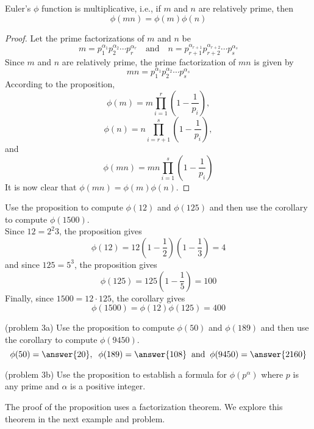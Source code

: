 \documentclass[handout]{ximera}
\begin{document}
\begin{corollary}
Euler's $\phi$ function is multiplicative, i.e., if $m$ and $n$ are relatively prime, then
\[
\phi(mn) = \phi(m)\phi(n)
\]
\end{corollary}
\begin{proof}
Let the prime factorizations of $m$ and $n$ be
\[
m = p_1^{\alpha_1} p_2^{\alpha_2}\cdots p_r^{\alpha_r} \quad \text{and} \quad n = p_{r+1}^{\alpha_{r+1}} p_{r+2}^{\alpha_{r+2}}\cdots p_s^{\alpha_s}
\]
Since $m$ and $n$ are relatively prime, the prime factorization of $mn$ is given by
\[
mn = p_1^{\alpha_1} p_2^{\alpha_2}\cdots p_s^{\alpha_s}
\]
According to the proposition,
\[
\phi(m) = m \prod_{i = 1}^r \left(1 - \frac{1}{p_i}\right),
\]
\[
\phi(n) = n \prod_{i = r+1}^s \left(1 - \frac{1}{p_i}\right),
\]
and
\[
\phi(mn) = mn \prod_{i = 1}^s \left(1 - \frac{1}{p_i}\right)
\]
It is now clear that $\phi(mn) = \phi(m) \phi(n)$.
\end{proof}

\begin{example}[example 3]
Use the proposition to compute $\phi(12)$ and $\phi(125)$ and then use the corollary to compute $\phi(1500)$.\\
Since $12 = 2^2 3$, the proposition gives
\[
\phi(12) = 12\left(1-\frac12\right)\left(1-\frac13\right) = 4
\]
and since $125 = 5^3$, the proposition gives
\[
\phi(125) = 125\left(1-\frac15\right) = 100
\]
Finally, since $1500 = 12 \cdot 125$, the corollary gives
\[
\phi(1500) = \phi(12)\phi(125) = 400
\]
\end{example}

\begin{problem}(problem 3a)
Use the proposition to compute $\phi(50)$ and $\phi(189)$ and then use the corollary to compute 
$\phi(9450)$.\\
\[
\phi(50) = \answer{20}, \;\; \phi(189) = \answer{108} \;\; \text{and} \;\; \phi(9450)= \answer{2160}
\]
\end{problem}

\begin{problem}(problem 3b)
Use the proposition to establish a formula for $\phi(p^\alpha)$ where $p$ is any prime and $\alpha$ is a positive integer.
\end{problem}


The proof of the proposition uses a factorization theorem. We explore this theorem in the next example and problem.
\end{document}
